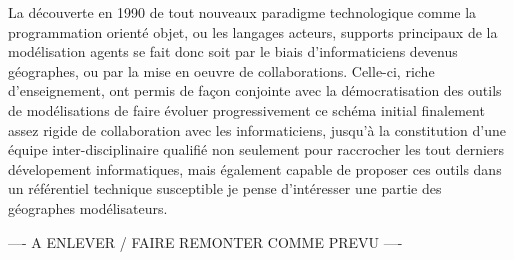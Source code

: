
La découverte en 1990 de tout nouveaux paradigme technologique comme la programmation orienté objet, ou les langages acteurs, supports principaux de la modélisation agents se fait donc soit par le biais d’informaticiens devenus géographes, ou par la mise en oeuvre de collaborations. Celle-ci, riche d’enseignement, ont permis de façon conjointe avec la démocratisation des outils de modélisations de faire évoluer progressivement ce schéma initial finalement assez rigide de collaboration avec les informaticiens, jusqu’à la constitution d’une équipe inter-disciplinaire qualifié non seulement pour raccrocher les tout derniers dévelopement informatiques, mais également capable de proposer ces outils dans un référentiel technique susceptible je pense d'intéresser une partie des géographes modélisateurs.



---- A ENLEVER / FAIRE REMONTER COMME PREVU ----

